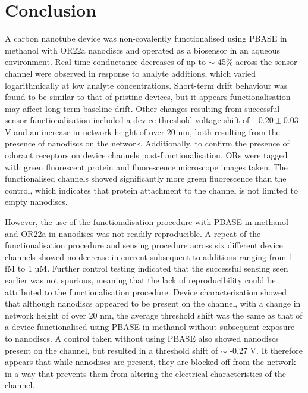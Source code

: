 \documentclass[
  a4paper,
]{scrbook}
\begin{document}
\hypertarget{conclusion-1}{%
\section{Conclusion}\label{conclusion-1}}

A carbon nanotube device was non-covalently functionalised using PBASE
in methanol with OR22a nanodiscs and operated as a biosensor in an
aqueous environment. Real-time conductance decreases of up to \(\sim\)
45\% across the sensor channel were observed in response to analyte
additions, which varied logarithmically at low analyte concentrations.
Short-term drift behaviour was found to be similar to that of pristine
devices, but it appears functionalisation may affect long-term baseline
drift. Other changes resulting from successful sensor functionalisation
included a device threshold voltage shift of \(-0.20\pm0.03\) V and an
increase in network height of over 20 nm, both resulting from the
presence of nanodiscs on the network. Additionally, to confirm the
presence of odorant receptors on device channels post-functionalisation,
ORs were tagged with green fluorescent protein and fluorescence
microscope images taken. The functionalised channels showed
significantly more green fluorescence than the control, which indicates
that protein attachment to the channel is not limited to empty
nanodiscs.

However, the use of the functionalisation procedure with PBASE in
methanol and OR22a in nanodiscs was not readily reproducible. A repeat
of the functionalisation procedure and sensing procedure across six
different device channels showed no decrease in current subsequent to
additions ranging from 1 fM to 1 µM. Further control testing indicated
that the successful sensing seen earlier was not spurious, meaning that
the lack of reproducibility could be attributed to the functionalisation
procedure. Device characterisation showed that although nanodiscs
appeared to be present on the channel, with a change in network height
of over 20 nm, the average threshold shift was the same as that of a
device functionalised using PBASE in methanol without subsequent
exposure to nanodiscs. A control taken without using PBASE also showed
nanodiscs present on the channel, but resulted in a threshold shift of
\(\sim\) -0.27 V. It therefore appears that while nanodiscs are present,
they are blocked off from the network in a way that prevents them from
altering the electrical characteristics of the channel.
\end{document}
